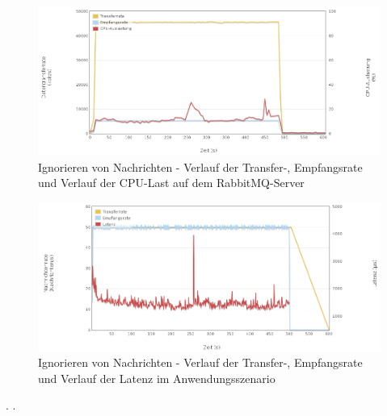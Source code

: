 \documentclass[	a4paper,
			11pt,
			titlepage,
			oneside,
			fleqn,
			listof=totoc,
			parskip,
			numbers=noenddot]{scrartcl}
\begin{document}
		\begin{figure}[!htb]
			\centering
			\includegraphics[width=\textwidth]{img/no/no_server2.png}
			\caption{Ignorieren von Nachrichten - Verlauf der Transfer-, Empfangsrate und Verlauf der CPU-Last auf dem RabbitMQ-Server}
			\label{fig:no-server2}
		\end{figure}
		
		\begin{figure}[!htb]
			\centering
			\includegraphics[width=\textwidth]{img/no/no_scenario.png}
			\caption{Ignorieren von Nachrichten - Verlauf der Transfer-, Empfangsrate und Verlauf der Latenz im Anwendungsszenario}
			\label{fig:no-scenario}
		\end{figure}
	
	
	\clearpage
		{%
		  \newline
		  \newline
		  \newline
		}{%
		 .
		}{%
		 .
		}
		
\end{document}
